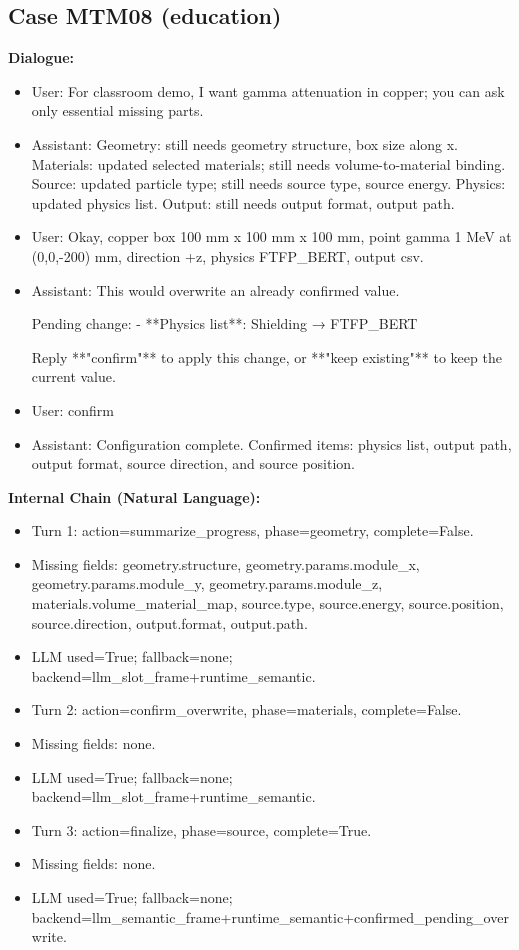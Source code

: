\documentclass[11pt]{ctexart}
\begin{document}
\subsection{Case MTM08 (education)}
\textbf{Dialogue:}
\begin{itemize}
\item User: For classroom demo, I want gamma attenuation in copper; you can ask only essential missing parts.
\item Assistant: Geometry: still needs geometry structure, box size along x. Materials: updated selected materials; still needs volume-to-material binding. Source: updated particle type; still needs source type, source energy. Physics: updated physics list. Output: still needs output format, output path.
\item User: Okay, copper box 100 mm x 100 mm x 100 mm, point gamma 1 MeV at (0,0,-200) mm, direction +z, physics FTFP\_BERT, output csv.
\item Assistant: This would overwrite an already confirmed value.

Pending change:
- **Physics list**: Shielding → FTFP\_BERT

Reply **"confirm"** to apply this change, or **"keep existing"** to keep the current value.
\item User: confirm
\item Assistant: Configuration complete. Confirmed items: physics list, output path, output format, source direction, and source position.
\end{itemize}
\textbf{Internal Chain (Natural Language):}
\begin{itemize}
\item Turn 1: action=summarize\_progress, phase=geometry, complete=False.
\item Missing fields: geometry.structure, geometry.params.module\_x, geometry.params.module\_y, geometry.params.module\_z, materials.volume\_material\_map, source.type, source.energy, source.position, source.direction, output.format, output.path.
\item LLM used=True; fallback=none; backend=llm\_slot\_frame+runtime\_semantic.
\item Turn 2: action=confirm\_overwrite, phase=materials, complete=False.
\item Missing fields: none.
\item LLM used=True; fallback=none; backend=llm\_slot\_frame+runtime\_semantic.
\item Turn 3: action=finalize, phase=source, complete=True.
\item Missing fields: none.
\item LLM used=True; fallback=none; backend=llm\_semantic\_frame+runtime\_semantic+confirmed\_pending\_overwrite.
\end{itemize}
\end{document}
